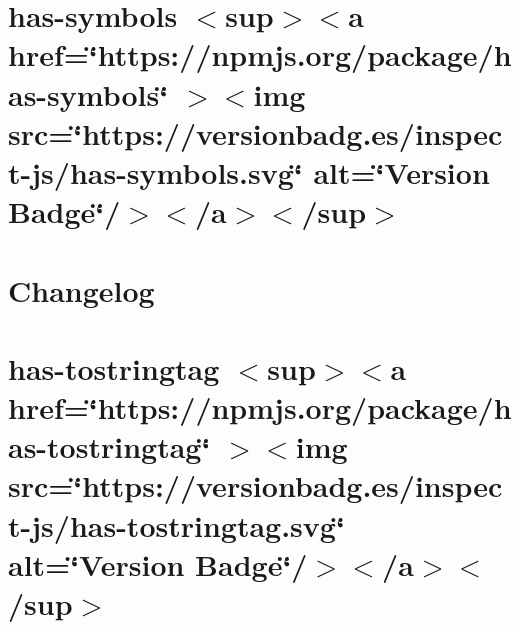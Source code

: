 \documentclass[twoside]{book}
\newcommand{\+}{\discretionary{\mbox{\scriptsize$\hookleftarrow$}}{}{}}
\begin{document}
\chapter{has-\/symbols \texorpdfstring{$<$}{<}sup\texorpdfstring{$>$}{>}\texorpdfstring{$<$}{<}a href=\char`\"{}https\+://npmjs.\+org/package/has-\/symbols\char`\"{} \texorpdfstring{$>$}{>}\texorpdfstring{$<$}{<}img src=\char`\"{}https\+://versionbadg.\+es/inspect-\/js/has-\/symbols.\+svg\char`\"{} alt=\char`\"{}\+Version Badge\char`\"{}/\texorpdfstring{$>$}{>}\texorpdfstring{$<$}{<}/a\texorpdfstring{$>$}{>}\texorpdfstring{$<$}{<}/sup\texorpdfstring{$>$}{>}}
\label{md__c___users_vaishnavi_jadhav__desktop__developer_code_mean_stack_example_client_node_modules_has_symbols__r_e_a_d_m_e}

\chapter{Changelog}
\label{md__c___users_vaishnavi_jadhav__desktop__developer_code_mean_stack_example_client_node_modules_h3460553fdc70972a20e04ed7ec26f4b3}

\chapter{has-\/tostringtag \texorpdfstring{$<$}{<}sup\texorpdfstring{$>$}{>}\texorpdfstring{$<$}{<}a href=\char`\"{}https\+://npmjs.\+org/package/has-\/tostringtag\char`\"{} \texorpdfstring{$>$}{>}\texorpdfstring{$<$}{<}img src=\char`\"{}https\+://versionbadg.\+es/inspect-\/js/has-\/tostringtag.\+svg\char`\"{} alt=\char`\"{}\+Version Badge\char`\"{}/\texorpdfstring{$>$}{>}\texorpdfstring{$<$}{<}/a\texorpdfstring{$>$}{>}\texorpdfstring{$<$}{<}/sup\texorpdfstring{$>$}{>}}
\label{md__c___users_vaishnavi_jadhav__desktop__developer_code_mean_stack_example_client_node_modules_has_tostringtag__r_e_a_d_m_e}

\end{document}
